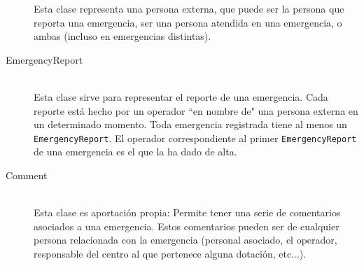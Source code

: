 \begin{description}
        Esta clase representa una persona externa, que puede ser la persona que reporta una emergencia, ser una persona atendida en una emergencia, o ambas (incluso en emergencias distintas).
    \item[EmergencyReport] \hfill \\
        Esta clase sirve para representar el reporte de una emergencia. Cada reporte está hecho por un operador ``en nombre de" una persona externa en un determinado momento. Toda emergencia registrada tiene al menos un \texttt{EmergencyReport}. El operador correspondiente al primer \texttt{EmergencyReport} de una emergencia es el que la ha dado de alta.
    \item[Comment] \hfill \\
        Esta clase es aportación propia: Permite tener una serie de comentarios asociados a una emergencia. Estos comentarios pueden ser de cualquier persona relacionada con la emergencia (personal asociado, el operador, responsable del centro al que pertenece alguna dotación, etc...).
\end{description}
